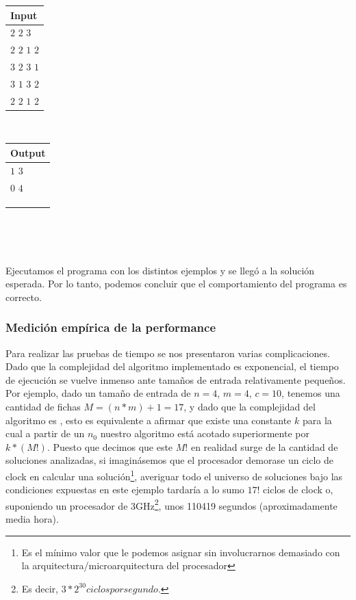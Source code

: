 \documentclass[11pt, a4paper, twoside]{article}
\begin{document}
\begin{itemize}
\begin{itemize}
			\begin{minipage}{0.2\textwidth}
				\begin{tabular}{l}
					Input  \\
					\hline
					$2$ $2$ $3$     \\
					$2$ $2$ $1$ $2$ \\
					$3$ $2$ $3$ $1$ \\
					$3$ $1$ $3$ $2$ \\
					$2$ $2$ $1$ $2$ \\
				\end{tabular} \\  
			\end{minipage}
			\begin{minipage}{0.2\textwidth}	
				\begin{tabular}{l}
					Output  \\
					\hline
					$1$ $3$ \\
					$0$ $4$ \\
					\\
					\\
					\\
				\end{tabular} \\
			\end{minipage} \\
		
	\end{itemize}
		
\end{itemize}

Ejecutamos el programa con los distintos ejemplos y se llegó a la solución
esperada. Por lo tanto, podemos concluir que el comportamiento del programa es
correcto.

\clearpage

\subsubsection{Medición empírica de la performance}

Para realizar las pruebas de tiempo se nos presentaron varias complicaciones.
Dado que la complejidad del algoritmo implementado es exponencial, el tiempo de
ejecución se vuelve inmenso ante tamaños de entrada relativamente pequeños. Por
ejemplo, dado un tamaño de entrada de $n=4$, $m=4$, $c=10$, tenemos una cantidad
de fichas $M=(n*m)+1=17$, y dado que la complejidad del algoritmo es ,
esto es equivalente a afirmar que existe una constante $k$ para la cual a partir
de un $n_0$ nuestro algoritmo está acotado superiormente por $k*(M!)$. Puesto
que decimos que este $M!$ en realidad surge de la cantidad de soluciones
analizadas, si imaginásemos que el procesador demorase un ciclo de clock en
calcular una solución\footnote{Es el mínimo valor que le podemos asignar sin
involucrarnos demasiado con la arquitectura/microarquitectura del procesador},
averiguar todo el universo de soluciones bajo las condiciones expuestas en este
ejemplo tardaría a lo sumo $17!$ ciclos de clock o, suponiendo un procesador de
3GHz\footnote{Es decir, $3*2^30 ciclos por segundo.$}, unos 110419 segundos
(aproximadamente media hora).
\end{document}
